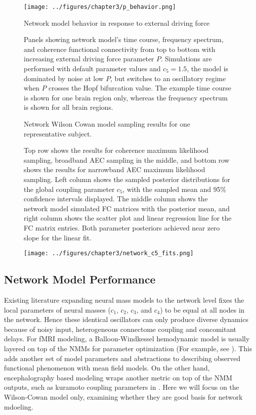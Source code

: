 \begin{figure}[htbp]
    \centering
    \texttt{[image: ../figures/chapter3/p\_behavior.png]}
    \caption{Network model behavior in response to external driving force}
    \caption*{Panels showing network model's time course, frequency spectrum, and coherence functional connectivity from top to bottom with increasing external driving force parameter $P$. Simulations are performed with default parameter values and $c_5 = 1.5$, the model is dominated by noise at low $P$, but switches to an oscillatory regime when $P$ crosses the Hopf bifurcation value. The example time course is shown for one brain region only, whereas the frequency spectrum is shown for all brain regions.}
    \label{fig:p_behavior}
\end{figure}

\begin{figure}[htbp]
    \caption{Network Wilson Cowan model sampling results for one representative subject.}
    \caption*{Top row shows the results for coherence maximum likelihood sampling, broadband AEC sampling in the middle, and bottom row shows the results for narrowband AEC maximum likelihood sampling. Left column shows the sampled posterior distributions for the global coupling parameter $c_5$, with the sampled mean and 95\% confidence intervals displayed. The middle column shows the network model simulated FC matrices with the posterior mean, and right column shows the scatter plot and linear regression line for the FC matrix entries. Both parameter posteriors achieved near zero slope for the linear fit.}
    \label{fig:networkc5}
\end{figure}
\clearpage
\begin{figure}[h!]
	\ContinuedFloat
	\captionsetup{labelformat=adja-page}
    \centering
    \texttt{[image: ../figures/chapter3/network\_c5\_fits.png]}
    \caption[]{}
\end{figure}


\subsection{Network Model Performance}
Existing literature expanding neural mass models to the network level fixes the local parameters of neural masses ($c_1$, $c_2$, $c_3$, and $c_4$) to be equal at all nodes in the network. Hence these identical oscillators can only produce diverse dynamics because of noisy input, heterogeneous connectome coupling and concomitant delays. For fMRI modeling, a Balloon-Windkessel hemodynamic model \cite{buxton_dynamics_1998, friston_nonlinear_2000} is usually layered on top of the NMMs for parameter optimization (For example, see \cite{Zimmermann2018}). This adds another set of model parameters and abstractions to describing observed functional phenomenon with mean field models. On the other hand, encephalography based modeling wraps another metric on top of the NMM outputs, such as kuramoto coupling parameters in \cite{Deco2009}.  Here we will focus on the Wilson-Cowan model only, examining whether they are good basis for network mdoeling.

